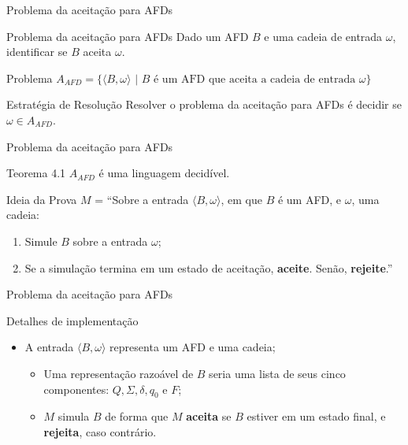 \documentclass[xcolor=dvipsnames,table]{beamer}
\begin{document}
	\begin{frame}{Problema da aceitação para AFDs}
		\begin{block}{Problema da aceitação para AFDs}
			Dado um AFD $B$ e uma cadeia de entrada $\omega$, identificar se $B$ aceita $\omega$.
		\end{block}	\pause
		\begin{block}{Problema}
			$A_{AFD} = \{ \langle B, \omega \rangle \mbox{ | } B \mbox{ é um AFD que aceita a cadeia de entrada } \omega \}$
		\end{block} \pause
		\begin{block}{Estratégia de Resolução}
			Resolver o problema da aceitação para AFDs é decidir se $\omega \in A_{AFD}$.
		\end{block}
	\end{frame}
	
	\begin{frame}{Problema da aceitação para AFDs}
		\begin{block}{Teorema 4.1}
			$A_{AFD}$ é uma linguagem decidível.
		\end{block} \pause
		\begin{block}{Ideia da Prova}
			$M$ = ``Sobre a entrada $\langle B, \omega \rangle$, em que $B$ é um AFD, e $\omega$, uma cadeia:
			\begin{enumerate}
				\item Simule $B$ sobre a entrada $\omega$;
				\item Se a simulação termina em um estado de aceitação, {\bf aceite}. Senão, {\bf rejeite}.''
			\end{enumerate}
		\end{block}
	\end{frame}
	
	\begin{frame}{Problema da aceitação para AFDs}
		\begin{block}{Detalhes de implementação}
			\begin{itemize}
				\item A entrada $\langle B, \omega \rangle$ representa um AFD e uma cadeia;
				\begin{itemize}
					\item Uma representação razoável de $B$ seria uma lista de seus cinco componentes: $Q, \Sigma, \delta, q_0$ e $F$;
					\item $M$ simula $B$ de forma que $M$ {\bf aceita} se $B$ estiver em um estado final, e {\bf rejeita}, caso contrário.
				\end{itemize}
			\end{itemize}
		\end{block}
	\end{frame}
	
\end{document}
